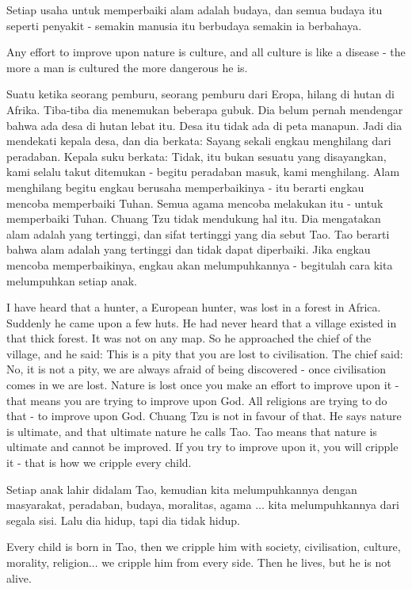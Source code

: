 \bahasa
Setiap usaha untuk memperbaiki alam adalah budaya, dan semua budaya itu seperti penyakit - semakin manusia itu berbudaya semakin ia berbahaya.

\english
Any effort to improve upon nature is culture, and all culture is like a disease - the more a man is cultured the more dangerous he is.

\bahasa
Suatu ketika seorang pemburu, seorang pemburu dari Eropa, hilang di hutan di Afrika. Tiba-tiba dia menemukan beberapa gubuk. Dia belum pernah mendengar bahwa ada desa di hutan lebat itu. Desa itu tidak ada di peta manapun. Jadi dia mendekati kepala desa, dan dia berkata: Sayang sekali engkau menghilang dari peradaban. Kepala suku berkata: Tidak, itu bukan sesuatu yang disayangkan, kami selalu takut ditemukan - begitu peradaban masuk, kami menghilang. Alam menghilang begitu engkau berusaha memperbaikinya - itu berarti engkau mencoba memperbaiki Tuhan. Semua agama mencoba melakukan itu - untuk memperbaiki Tuhan. Chuang Tzu tidak mendukung hal itu. Dia mengatakan alam adalah yang tertinggi, dan sifat tertinggi yang dia sebut Tao. Tao berarti bahwa alam adalah yang tertinggi dan tidak dapat diperbaiki. Jika engkau mencoba memperbaikinya, engkau akan melumpuhkannya - begitulah cara kita melumpuhkan setiap anak.

\english
I have heard that a hunter, a European hunter, was lost in a forest in Africa. Suddenly he came upon a few huts. He had never heard that a village existed in that thick forest. It was not on any map. So he approached the chief of the village, and he said: This is a pity that you are lost to civilisation. The chief said: No, it is not a pity, we are always afraid of being discovered - once civilisation comes in we are lost. Nature is lost once you make an effort to improve upon it - that means you are trying to improve upon God. All religions are trying to do that - to improve upon God. Chuang Tzu is not in favour of that. He says nature is ultimate, and that ultimate nature he calls Tao. Tao means that nature is ultimate and cannot be improved. If you try to improve upon it, you will cripple it - that is how we cripple every child.

\bahasa
Setiap anak lahir didalam Tao, kemudian kita melumpuhkannya dengan masyarakat, peradaban, budaya, moralitas, agama ... kita melumpuhkannya dari segala sisi. Lalu dia hidup, tapi dia tidak hidup.

\english
Every child is born in Tao, then we cripple him with society, civilisation, culture, morality, religion... we cripple him from every side. Then he lives, but he is not alive.

